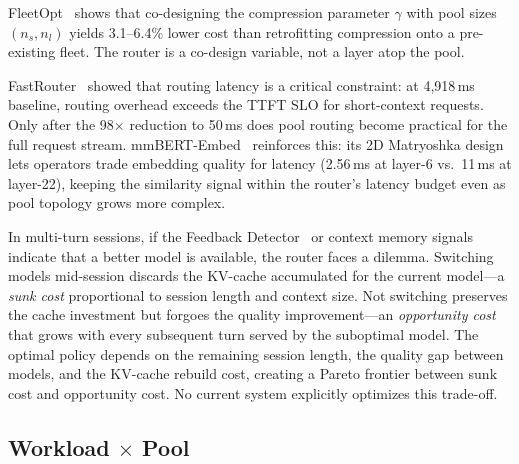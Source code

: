 \begin{observation}
\label{obs:rp-codesign}
FleetOpt~\cite{fleetopt2026} shows that co-designing the compression
parameter $\gamma$ with pool sizes $(n_s, n_l)$ yields 3.1--6.4\%
lower cost than retrofitting compression onto a pre-existing fleet.
The router is a co-design variable, not a layer atop the pool.
\end{observation}

\begin{observation}
\label{obs:rp-latency}
FastRouter~\cite{fastrouter2026} showed that routing latency is
a critical constraint: at 4,918\,ms baseline, routing overhead
exceeds the TTFT SLO for short-context requests.  Only after the
98$\times$ reduction to 50\,ms does pool routing become practical
for the full request stream.
mmBERT-Embed~\cite{mmberted2025} reinforces this: its 2D Matryoshka
design lets operators trade embedding quality for latency
(2.56\,ms at layer-6 vs.\ 11\,ms at layer-22), keeping the
similarity signal within the router's latency budget even as pool
topology grows more complex.
\end{observation}

\begin{observation}
\label{obs:rp-sunkcost}
In multi-turn sessions, if the Feedback
Detector~\cite{feedbackdet2026} or context memory signals indicate
that a better model is available, the router faces a dilemma.
Switching models mid-session discards the KV-cache accumulated for
the current model---a \emph{sunk cost} proportional to session
length and context size.  Not switching preserves the cache
investment but forgoes the quality improvement---an \emph{opportunity
cost} that grows with every subsequent turn served by the
suboptimal model.  The optimal policy depends on the remaining
session length, the quality gap between models, and the KV-cache
rebuild cost, creating a Pareto frontier between sunk cost and opportunity cost.
No current system explicitly optimizes this trade-off.
\end{observation}


\subsection{Workload $\times$ Pool}
\label{sec:cross:wp}

